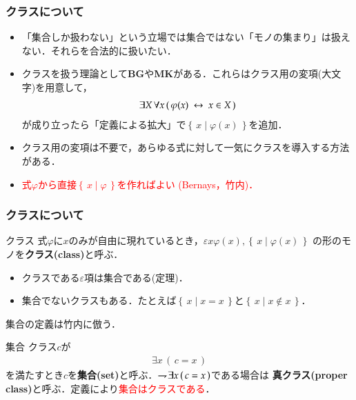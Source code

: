 \documentclass[dvipdfmx,10pt,notheorems]{beamer}
\theoremstyle{definition}
\newcommand{\Set}[2]{\left\{\, #1 \mid #2\, \right\}} %
\newcommand{\negation}{\rightharpoondown\hspace{-0.25em}} %
\newcommand{\lrarrow}{\hspace{0.25em}\leftrightarrow\hspace{0.25em}} %
\begin{document}
\begin{frame}\frametitle{クラスについて}
	\begin{itemize}
		\item 「集合しか扱わない」という立場では集合ではない「モノの集まり」は扱えない．それらを合法的に扱いたい．
		\item クラスを扱う理論として{\bf BG}や{\bf MK}がある．これらはクラス用の変項(大文字)を用意して，
			\begin{align}
				\exists X\, \forall x\, (\, \varphi(x) \lrarrow x \in X\, )
			\end{align}
			が成り立ったら「定義による拡大」で$\Set{x}{\varphi(x)}$を追加．
			
		\item クラス用の変項は不要で，あらゆる式に対して一気にクラスを導入する方法がある．
		
		\item \textcolor{red}{式$\varphi$から直接$\Set{x}{\varphi}$を作ればよい
			(Bernays\cite{Bernays}，竹内\cite{TakeuchiSet})．}
	\end{itemize}
\end{frame}

\begin{frame}\frametitle{クラスについて}
	\begin{exampleblock}{クラス}
		式$\varphi$に$x$のみが自由に現れているとき，$\varepsilon x \varphi(x),\Set{x}{\varphi(x)}$
		の形のモノを{\bf クラス(class)}と呼ぶ．
	\end{exampleblock}
	
	\begin{itemize}
		\item クラスである$\varepsilon$項は集合である(定理)．
		\item 集合でないクラスもある．たとえば$\Set{x}{x = x}$と$\Set{x}{x \notin x}$．
	\end{itemize}
	
	集合の定義は竹内\cite{TakeuchiSet}に倣う．
	\begin{exampleblock}{集合}
		クラス$c$が
		\begin{align}
			\exists x\, (\, c = x\, )
		\end{align}
		を満たすとき$c$を{\bf 集合(set)}と呼ぶ．$\negation \exists x\, (\, c = x\, )$である場合は
		{\bf 真クラス(proper class)}と呼ぶ．定義により\textcolor{red}{集合はクラスである}．
	\end{exampleblock}
\end{frame}
\end{document}
